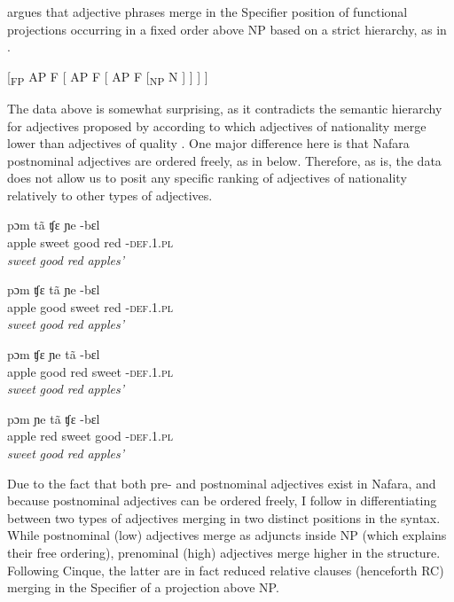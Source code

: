 \documentclass[output=paper]{langscibook}
\begin{document}
\citet{Cinque1994} argues that adjective phrases merge in the Specifier position of functional projections occurring in a fixed order above NP based on a strict hierarchy, as in .


\ea\label{ex:baron:11}
[\textsubscript{FP}  AP  F  [  AP  F  [  AP  F  [\textsubscript{NP}  N  ] ] ] ]
\z

The data above is somewhat surprising, as it contradicts the semantic hierarchy for adjectives proposed by \citet{Cinque1994} according to which adjectives of nationality merge lower than adjectives of quality \citep[96]{Cinque1994}. One major difference here is that Nafara postnominal adjectives are ordered freely, as in  below. Therefore, as is, the data does not allow us to posit any specific ranking of adjectives of nationality relatively to other types of adjectives.


\ea\label{ex:baron:12}
\ea
\gll pɔm     tã   ʧɛ     ɲe    -bɛl    \\
apple    sweet   good    red    -\textsc{def.1.pl}\\
 \textit{sweet} \textit{good} \textit{red} \textit{apples’}



\ex
\gll   pɔm     ʧɛ   tã     ɲe    -bɛl   \\
apple    good  sweet     red    -\textsc{def.1.pl}\\
 \textit{sweet} \textit{good} \textit{red} \textit{apples’}



\ex
\gll   pɔm     ʧɛ   ɲe    tã     -bɛl    \\
apple    good  red    sweet     -\textsc{def.1.pl}\\
 \textit{sweet} \textit{good} \textit{red} \textit{apples’}



\ex
\gll   pɔm     ɲe  tã     ʧɛ     -bɛl     \\
apple    red  sweet     good    -\textsc{def.1.pl}\\
 \textit{sweet} \textit{good} \textit{red} \textit{apples’}
\z
\z

Due to the fact that both pre- and postnominal adjectives exist in Nafara, and because postnominal adjectives can be ordered freely, I follow \citet{Cinque2010} in differentiating between two types of adjectives merging in two distinct positions in the syntax. While postnominal (low) adjectives merge as adjuncts inside NP (which explains their free ordering), prenominal (high) adjectives merge higher in the structure. Following Cinque, the latter are in fact reduced relative clauses (henceforth RC) merging in the Specifier of a projection above NP.
\end{document}
